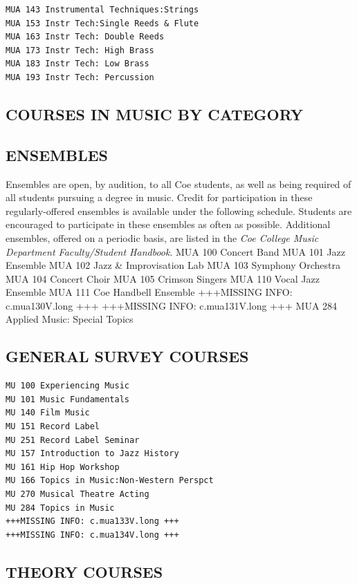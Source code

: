 \documentclass[
  letterpaper,
]{scrbook}
\begin{document}
\begin{verbatim}
MUA 143 Instrumental Techniques:Strings
MUA 153 Instr Tech:Single Reeds & Flute
MUA 163 Instr Tech: Double Reeds
MUA 173 Instr Tech: High Brass
MUA 183 Instr Tech: Low Brass
MUA 193 Instr Tech: Percussion
\end{verbatim}

\subsection{COURSES IN MUSIC BY
CATEGORY}\label{courses-in-music-by-category}

\subsection{ENSEMBLES}\label{ensembles}

Ensembles are open, by audition, to all Coe students, as well as being
required of all students pursuing a degree in music. Credit for
participation in these regularly-offered ensembles is available under
the following schedule. Students are encouraged to participate in these
ensembles as often as possible. Additional ensembles, offered on a
periodic basis, are listed in the \emph{Coe College Music Department
Faculty/Student Handbook}. MUA 100 Concert Band MUA 101 Jazz Ensemble
MUA 102 Jazz \& Improvisation Lab MUA 103 Symphony Orchestra MUA 104
Concert Choir MUA 105 Crimson Singers MUA 110 Vocal Jazz Ensemble MUA
111 Coe Handbell Ensemble +++MISSING INFO: c.mua130V.long +++ +++MISSING
INFO: c.mua131V.long +++ MUA 284 Applied Music: Special Topics

\subsection{GENERAL SURVEY COURSES}\label{general-survey-courses}

\begin{verbatim}
MU 100 Experiencing Music
MU 101 Music Fundamentals
MU 140 Film Music
MU 151 Record Label
MU 251 Record Label Seminar
MU 157 Introduction to Jazz History
MU 161 Hip Hop Workshop
MU 166 Topics in Music:Non-Western Perspct
MU 270 Musical Theatre Acting
MU 284 Topics in Music
+++MISSING INFO: c.mua133V.long +++
+++MISSING INFO: c.mua134V.long +++
\end{verbatim}

\subsection{THEORY COURSES}\label{theory-courses}
\end{document}
